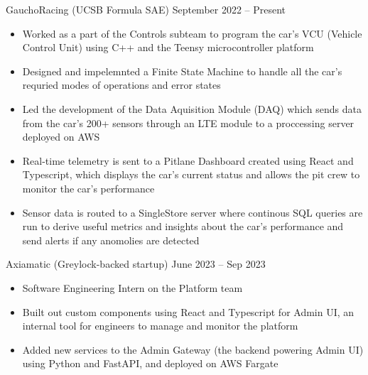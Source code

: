 \documentclass[9pt]{developercv} %
\begin{document}
\vspace{-18 pt}
\vspace{-4 pt}
\begin{entrylist}
    \vspace{-4 pt}
    \entry
		{}
		{GauchoRacing (UCSB Formula SAE)}
		{September 2022 – Present}
		{\vspace{-10pt}
        \begin{itemize}[noitemsep,topsep=0pt,parsep=0pt,partopsep=0pt, leftmargin=10pt]
            \item Worked as a part of the Controls subteam to program the car's VCU (Vehicle Control Unit) using C++ and the Teensy microcontroller platform
            \item Designed and impelemnted a Finite State Machine to handle all the car's requried modes of operations and error states
            \item Led the development of the Data Aquisition Module (DAQ) which sends data from the car's 200+ sensors through an LTE module to a proccessing server deployed on AWS
            \item Real-time telemetry is sent to a Pitlane Dashboard created using React and Typescript, which displays the car's current status and allows the pit crew to monitor the car's performance
            \item Sensor data is routed to a SingleStore server where continous SQL queries are run to derive useful metrics and insights about the car's performance and send alerts if any anomolies are detected
        \end{itemize}}
    \vspace{-4 pt}
	\entry
        {}
		{Axiamatic (Greylock-backed startup)}
		{June 2023 – Sep 2023}
		{\vspace{-10pt}
        \begin{itemize}[noitemsep,topsep=0pt,parsep=0pt,partopsep=0pt, leftmargin=10pt]
            \item Software Engineering Intern on the Platform team
            \item Built out custom components using React and Typescript for Admin UI, an internal tool for engineers to manage and monitor the platform
            \item Added new services to the Admin Gateway (the backend powering Admin UI) using Python and FastAPI, and deployed on AWS Fargate

\end{itemize}}
\end{entrylist}
\end{document}
